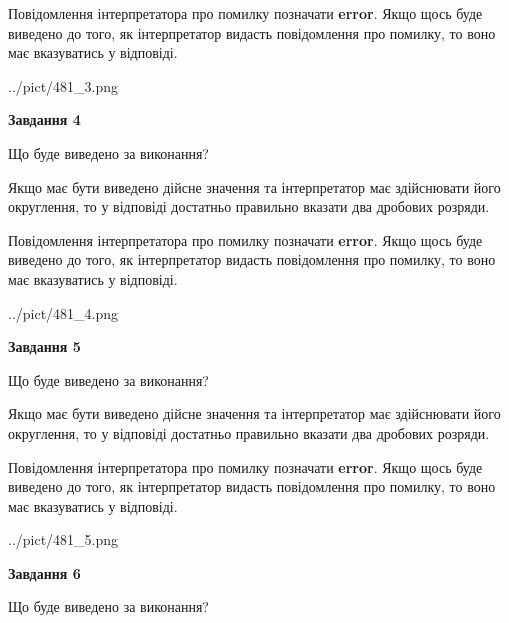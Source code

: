 \documentclass[12pt, ukrainian]{article}
\begin{document}
{\begin {Large}
Повідомлення інтерпретатора про помилку позначати \textbf{error}.
Якщо щось буде виведено до того, як інтерпретатор видасть повідомлення про помилку, 
то воно має вказуватись у відповіді. \par

\begin{center}
	{../pict/481_3.png}
\end{center}
\newpage

{\begin {center}\textbf{Завдання 4}\end {center}}\par
Що буде виведено за виконання? \par

Якщо має бути виведено дійсне значення та інтерпретатор має здійснювати його округлення, 
то у відповіді достатньо правильно вказати два дробових розряди.

Повідомлення інтерпретатора про помилку позначати \textbf{error}.
Якщо щось буде виведено до того, як інтерпретатор видасть повідомлення про помилку, 
то воно має вказуватись у відповіді. \par

\begin{center}
	{../pict/481_4.png}
\end{center}
\newpage

{\begin {center}\textbf{Завдання 5}\end {center}}\par
Що буде виведено за виконання? \par

Якщо має бути виведено дійсне значення та інтерпретатор має здійснювати його округлення, 
то у відповіді достатньо правильно вказати два дробових розряди.

Повідомлення інтерпретатора про помилку позначати \textbf{error}.
Якщо щось буде виведено до того, як інтерпретатор видасть повідомлення про помилку, 
то воно має вказуватись у відповіді. \par

\begin{center}
	{../pict/481_5.png}
\end{center}
\newpage

{\begin {center}\textbf{Завдання 6}\end {center}}\par
Що буде виведено за виконання? \par


\end{Large}}
\end{document}
